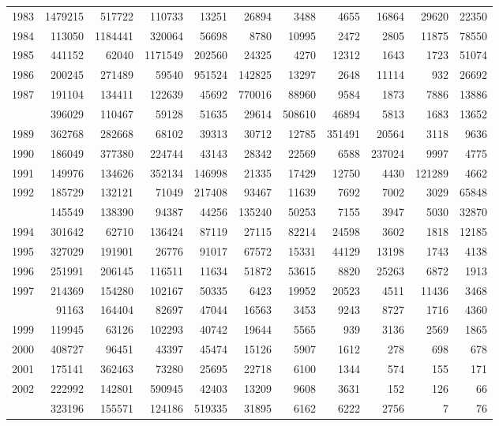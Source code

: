 \documentclass[
]{article}
\begin{document}
\begin{longtable}[t]{lrrrrrrrrrr}
1983 & 1479215 & 517722 & 110733 & 13251 & 26894 & 3488 & 4655 & 16864 & 29620 & 22350\\
1984 & 113050 & 1184441 & 320064 & 56698 & 8780 & 10995 & 2472 & 2805 & 11875 & 78550\\
1985 & 441152 & 62040 & 1171549 & 202560 & 24325 & 4270 & 12312 & 1643 & 1723 & 51074\\
1986 & 200245 & 271489 & 59540 & 951524 & 142825 & 13297 & 2648 & 11114 & 932 & 26692\\
1987 & 191104 & 134411 & 122639 & 45692 & 770016 & 88960 & 9584 & 1873 & 7886 & 13886\\
\addlinespace
1988 & 396029 & 110467 & 59128 & 51635 & 29614 & 508610 & 46894 & 5813 & 1683 & 13652\\
1989 & 362768 & 282668 & 68102 & 39313 & 30712 & 12785 & 351491 & 20564 & 3118 & 9636\\
1990 & 186049 & 377380 & 224744 & 43143 & 28342 & 22569 & 6588 & 237024 & 9997 & 4775\\
1991 & 149976 & 134626 & 352134 & 146998 & 21335 & 17429 & 12750 & 4430 & 121289 & 4662\\
1992 & 185729 & 132121 & 71049 & 217408 & 93467 & 11639 & 7692 & 7002 & 3029 & 65848\\
\addlinespace
1993 & 145549 & 138390 & 94387 & 44256 & 135240 & 50253 & 7155 & 3947 & 5030 & 32870\\
1994 & 301642 & 62710 & 136424 & 87119 & 27115 & 82214 & 24598 & 3602 & 1818 & 12185\\
1995 & 327029 & 191901 & 26776 & 91017 & 67572 & 15331 & 44129 & 13198 & 1743 & 4138\\
1996 & 251991 & 206145 & 116511 & 11634 & 51872 & 53615 & 8820 & 25263 & 6872 & 1913\\
1997 & 214369 & 154280 & 102167 & 50335 & 6423 & 19952 & 20523 & 4511 & 11436 & 3468\\
\addlinespace
1998 & 91163 & 164404 & 82697 & 47044 & 16563 & 3453 & 9243 & 8727 & 1716 & 4360\\
1999 & 119945 & 63126 & 102293 & 40742 & 19644 & 5565 & 939 & 3136 & 2569 & 1865\\
2000 & 408727 & 96451 & 43397 & 45474 & 15126 & 5907 & 1612 & 278 & 698 & 678\\
2001 & 175141 & 362463 & 73280 & 25695 & 22718 & 6100 & 1344 & 574 & 155 & 171\\
2002 & 222992 & 142801 & 590945 & 42403 & 13209 & 9608 & 3631 & 152 & 126 & 66\\
\addlinespace
2003 & 323196 & 155571 & 124186 & 519335 & 31895 & 6162 & 6222 & 2756 & 7 & 76\\

\end{longtable}
\end{document}
